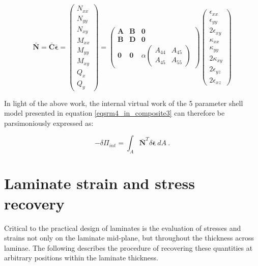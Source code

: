 \begin{equation} 
\bar{\mathbf{N}} = \bar{\mathbf{C}} \bar{\boldsymbol{\epsilon}} =
\begin{pmatrix}
N_{xx} \\
N_{yy} \\
N_{xy} \\
M_{xx} \\
M_{yy} \\
M_{xy} \\
Q_{x} \\
Q_{y} 
\end{pmatrix} 
=
\begin{pmatrix}
\mathbf{A} & \mathbf{B} & \mathbf{0} \\
\mathbf{B} & \mathbf{D} & \mathbf{0} \\
\mathbf{0}& \mathbf{0} & \alpha		\begin{pmatrix}
								{A}_{44} & {A}_{45} \\
 								{A}_{45} & {A}_{55} 
 								\end{pmatrix} 
\end{pmatrix} 
\begin{pmatrix}
\epsilon_{xx} \\
\epsilon_{yy} \\
2\epsilon_{xy}\\
\kappa_{xx}\\
\kappa_{yy}\\
2\kappa_{xy} \\
2\epsilon_{yz} \\
2\epsilon_{xz}
\end{pmatrix}
\label{eqscomp_laminate_constitutive7}
\end{equation}

In light of the above work, the internal virtual work of the 5 parameter shell model presented in equation \ref{eqsrm4_in_composite3} can therefore be parsimoniously expressed as:

\begin{equation} 
-\delta\Pi_{int} =
\int_A
\bar{\mathbf{N}}^T
\delta \bar{\boldsymbol{\epsilon}}
\ dA
\label{eqscomp_laminate_constitutive8}\ .
\end{equation}

\section{Laminate strain and stress recovery}
\label{Laminate strain and stress recovery}

Critical to the practical design of laminates is the evaluation of stresses and strains not only on the laminate mid-plane, but throughout the thickness across laminae. The following describes the procedure of recovering these quantities at arbitrary positions within the laminate thickness.


